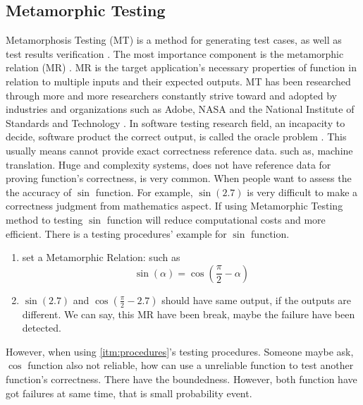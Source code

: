 \documentclass[conference]{IEEEtran}
\begin{document}
\begin{CJK*}{UTF8}{gbsn}
\subsection{Metamorphic Testing}
Metamorphosis Testing (MT) is a method for generating test cases, as well as test
results verification \cite{zhou2017introduction}. The most importance component is the metamorphic
relation (MR) \cite{chen2003fault}. MR is the target application's necessary
properties of function in relation to multiple inputs and their expected outputs.
MT has been researched through more and more researchers constantly strive
toward and adopted by industries and organizations such as Adobe, NASA and the
National Institute of Standards and Technology \cite{zhou2018metamorphic}.
In software testing research field, an incapacity to decide, software product
the correct output, is called the oracle problem \cite{brown2018metamorphic}.
This usually means cannot provide exact correctness reference data. such as,
machine translation. Huge and complexity systems, does not have
reference data for proving function's correctness, is very common.
When people want to assess the the accuracy of $\sin$ function. For example, $\sin(2.7)$ is very difficult to
make a correctness judgment from mathematics aspect. If using Metamorphic
Testing method to testing $\sin$ function will reduce computational costs and
more efficient. There is a testing procedures' example for $\sin$ function.
\begin{enumerate}\label{itm:procedures}
\item set a Metamorphic Relation: such as $$\sin(\alpha) = \cos(\frac{\pi}{2} - \alpha)$$
\item $\sin(2.7)$ and $\cos(\frac{\pi}{2} - 2.7)$ should have same output, if the
  outputs are different. We can say, this MR have been break, maybe the failure
  have been detected.
\end{enumerate}
However, when using \ref{itm:procedures}'s testing procedures. Someone maybe
ask, $\cos$ function also not reliable, how can use a unreliable function to
test another function's correctness. There have the boundedness. However, both
function have got failures at same time, that is small probability event.

\end{CJK*}
\end{document}
